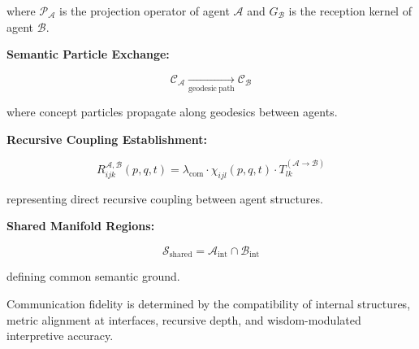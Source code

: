 where \(\mathcal{P}_{\mathcal{A}}\) is the projection operator of agent \(\mathcal{A}\) and \(G_{\mathcal{B}}\) is the reception kernel of agent \(\mathcal{B}\).


\textbf{Semantic Particle Exchange:}

\begin{equation}
\mathcal{C}_{\mathcal{A}} \xrightarrow[\mathrm{geodesic\ path}]{} \mathcal{C}_{\mathcal{B}}
\end{equation}

where concept particles propagate along geodesics between agents.


\textbf{Recursive Coupling Establishment:}

\begin{equation}
R_{ijk}^{\mathcal{A},\mathcal{B}}(p, q, t) = \lambda_{\mathrm{com}} \cdot \chi_{ijl}(p, q, t) \cdot T_{lk}^{(\mathcal{A} \to \mathcal{B})}
\end{equation}

representing direct recursive coupling between agent structures.


\textbf{Shared Manifold Regions:}

\begin{equation}
\mathcal{S}_{\mathrm{shared}} = \mathcal{A}_{\mathrm{int}} \cap \mathcal{B}_{\mathrm{int}}
\end{equation}

defining common semantic ground.

Communication fidelity is determined by the compatibility of internal structures, metric alignment at interfaces, recursive depth, and wisdom-modulated interpretive accuracy. 